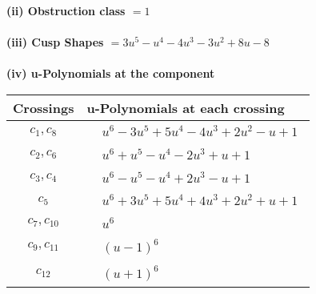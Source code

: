 \documentclass[1p]{elsarticle_modified}
\theoremstyle{definition}
\begin{document}
\flushleft \textbf{(ii) Obstruction class $= 1$}\\~\\
\flushleft \textbf{(iii) Cusp Shapes $= 3 u^5- u^4-4 u^3-3 u^2+8 u-8$}\\~\\
\newpage\renewcommand{\arraystretch}{1}
\flushleft \textbf{(iv) u-Polynomials at the component}\newline \\
\begin{tabular}{m{50pt}|m{274pt}}
Crossings & \hspace{64pt}u-Polynomials at each crossing \\
\hline $$\begin{aligned}c_{1},c_{8}\end{aligned}$$&$\begin{aligned}
&u^6-3 u^5+5 u^4-4 u^3+2 u^2- u+1
\end{aligned}$\\
\hline $$\begin{aligned}c_{2},c_{6}\end{aligned}$$&$\begin{aligned}
&u^6+u^5- u^4-2 u^3+u+1
\end{aligned}$\\
\hline $$\begin{aligned}c_{3},c_{4}\end{aligned}$$&$\begin{aligned}
&u^6- u^5- u^4+2 u^3- u+1
\end{aligned}$\\
\hline $$\begin{aligned}c_{5}\end{aligned}$$&$\begin{aligned}
&u^6+3 u^5+5 u^4+4 u^3+2 u^2+u+1
\end{aligned}$\\
\hline $$\begin{aligned}c_{7},c_{10}\end{aligned}$$&$\begin{aligned}
&u^6
\end{aligned}$\\
\hline $$\begin{aligned}c_{9},c_{11}\end{aligned}$$&$\begin{aligned}
&(u-1)^6
\end{aligned}$\\
\hline $$\begin{aligned}c_{12}\end{aligned}$$&$\begin{aligned}
&(u+1)^6
\end{aligned}$\\
\hline
\end{tabular}\\~\\
\end{document}

